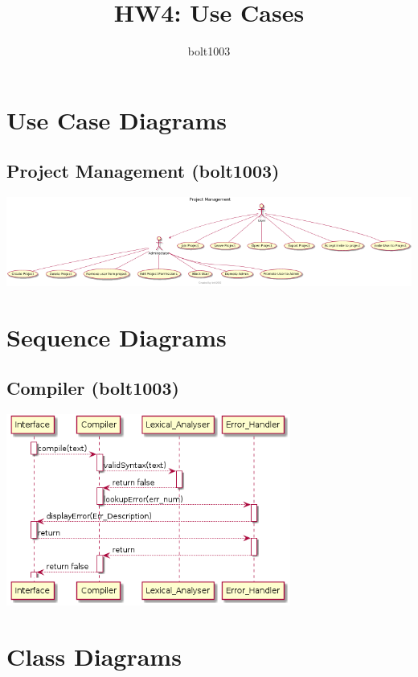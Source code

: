 \documentclass[11pt]{report}
\title{HW4: Use Cases}
\author{bolt1003}
\begin{document}
\maketitle

\chapter{Use Case Diagrams}
    \section{Project Management (bolt1003)}
        \includegraphics[width=\textwidth]{diagrams/usecase-projectmanagement}
        
\chapter{Sequence Diagrams}     
    \section{Compiler (bolt1003)}
        \begin{minipage}{1\textwidth}
            \begin{center}
                \includegraphics[width=0.7\textwidth]{diagrams/sequence-compiler}
            \end{center}
        \end{minipage}
        
\chapter{Class Diagrams}
\end{document}
